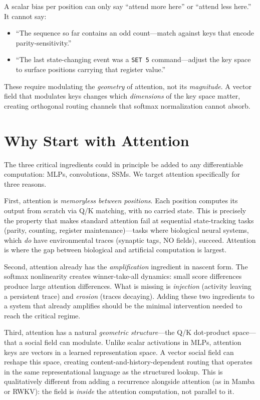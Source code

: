 \documentclass[11pt,a4paper]{article}
\begin{document}
A scalar bias per position can only say ``attend more here'' or
``attend less here.''  It cannot say:
\begin{itemize}
    \item ``The sequence so far contains an odd count---match against
          keys that encode parity-sensitivity.''
    \item ``The last state-changing event was a \texttt{SET 5}
          command---adjust the key space to surface positions carrying
          that register value.''
\end{itemize}

These require modulating the \emph{geometry} of attention, not its
\emph{magnitude}.  A vector field that modulates keys changes which
\emph{dimensions} of the key space matter, creating orthogonal
routing channels that softmax normalization cannot absorb.


\section{Why Start with Attention}
\label{sec:why_attention}

The three critical ingredients could in principle be added to any
differentiable computation: MLPs, convolutions, SSMs.  We target
attention specifically for three reasons.

First, attention is \emph{memoryless between positions}.  Each
position computes its output from scratch via Q/K matching, with no
carried state.  This is precisely the property that makes standard
attention fail at sequential state-tracking tasks (parity, counting,
register maintenance)---tasks where biological neural systems, which
\emph{do} have environmental traces (synaptic tags, NO fields),
succeed.  Attention is where the gap between biological and artificial
computation is largest.

Second, attention already has the \emph{amplification} ingredient in
nascent form.  The softmax nonlinearity creates winner-take-all
dynamics: small score differences produce large attention
differences.  What is missing is \emph{injection} (activity leaving a
persistent trace) and \emph{erosion} (traces decaying).  Adding these
two ingredients to a system that already amplifies should be the
minimal intervention needed to reach the critical regime.

Third, attention has a natural \emph{geometric structure}---the Q/K
dot-product space---that a social field can modulate.  Unlike scalar
activations in MLPs, attention keys are vectors in a learned
representation space.  A vector social field can reshape this space,
creating content-and-history-dependent routing that operates in the
same representational language as the structured lookup.  This is
qualitatively different from adding a recurrence alongside attention
(as in Mamba or RWKV): the field is \emph{inside} the attention
computation, not parallel to it.
\end{document}
